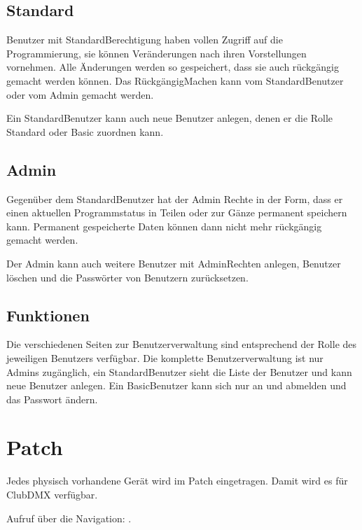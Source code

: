 \documentclass[letterpaper,10pt,ngerman]{sphinxmanual}
\begin{document}
\section{Standard}
\label{\detokenize{benutzer:standard}}
Benutzer mit Standard\sphinxhyphen{}Berechtigung haben vollen Zugriff auf die Programmierung,
sie können Veränderungen nach ihren Vorstellungen vornehmen. Alle
Änderungen werden so gespeichert, dass sie auch rückgängig gemacht
werden können. Das Rückgängig\sphinxhyphen{}Machen kann vom Standard\sphinxhyphen{}Benutzer oder vom
Admin gemacht werden.

Ein Standard\sphinxhyphen{}Benutzer kann auch neue Benutzer anlegen, denen er die Rolle
Standard oder Basic zuordnen kann.


\section{Admin}
\label{\detokenize{benutzer:admin}}
Gegenüber dem Standard\sphinxhyphen{}Benutzer hat der Admin Rechte in der
Form, dass er einen aktuellen Programmstatus in Teilen oder zur Gänze
permanent speichern kann. Permanent gespeicherte Daten können dann nicht
mehr rückgängig gemacht werden.

Der Admin kann auch weitere Benutzer mit Admin\sphinxhyphen{}Rechten anlegen, Benutzer
löschen und die Passwörter von Benutzern zurücksetzen.


\section{Funktionen}
\label{\detokenize{benutzer:funktionen}}
Die verschiedenen Seiten zur Benutzerverwaltung sind entsprechend der Rolle des
jeweiligen Benutzers verfügbar. Die komplette Benutzerverwaltung ist nur
Admins zugänglich, ein Standard\sphinxhyphen{}Benutzer sieht die Liste der Benutzer und
kann neue Benutzer anlegen. Ein Basic\sphinxhyphen{}Benutzer kann sich nur an\sphinxhyphen{} und abmelden
und das Passwort ändern.


\chapter{Patch}
\label{\detokenize{patch:patch}}\label{\detokenize{patch:patchlabel}}\label{\detokenize{patch::doc}}
Jedes physisch vorhandene Gerät wird im Patch eingetragen.
Damit wird es für ClubDMX verfügbar.

Aufruf über die Navigation: .
\end{document}
